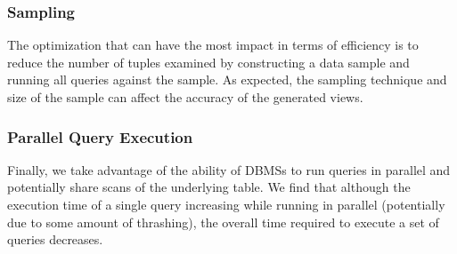 \subsubsection{Sampling} 
The optimization that can have the most impact in terms of efficiency is to
reduce the number of tuples examined by constructing a data sample and running
all queries against the sample. As expected, the sampling technique and size of
the sample can affect the accuracy of the generated views.
  
\subsubsection{Parallel Query Execution}
Finally, we take advantage of the ability of DBMSs to run queries in parallel
and potentially share scans of the underlying table. We find that although the
execution time of a single query increasing while running in parallel
(potentially due to some amount of thrashing), the overall time required to
execute a set of queries decreases.
